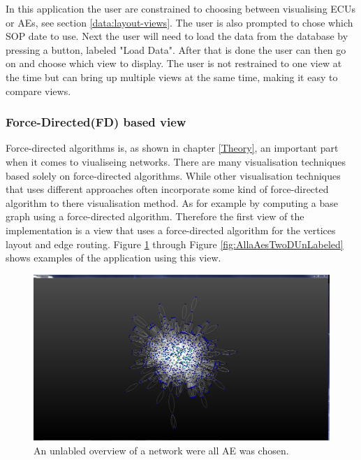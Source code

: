 \documentclass[a4paper,11pt]{kth-mag}
\begin{document}
In this application the user are constrained to choosing between visualising ECUs or AEs, see section \ref{data:layout-views}. The user is also prompted to chose which SOP date to use. Next the user 
will need to load the data from the database by pressing a button, labeled "Load Data". After that is done the user can then go on and choose which view to display. The user is not restrained to one view at the 
time but can bring up multiple views at the same time, making it easy to compare views.
\subsubsection{Force-Directed(FD) based view}
\label{FD-based-view}
Force-directed algorithms is, as shown in chapter \ref{Theory}, an important part when it comes to viualiseing networks. There are many visualisation techniques based solely on force-directed algorithms.
While other visualisation techniques that uses different approaches often incorporate some kind of force-directed algorithm to there visualisation method. As for example by computing a base graph using a
 force-directed algorithm. Therefore the first view of the implementation is a view that uses a force-directed algorithm for the vertices layout and edge routing. Figure \ref{fig:AllaAE2} through Figure \ref{fig:AllaAesTwoDUnLabeled}
 shows examples of the application using this view.

\begin{figure}[!htbp]
	\centering
	\includegraphics[scale=0.3]{SesammVisualAppPics/2D-View/Unlabled/AE/AllaAE2}
	\caption{An unlabled overview of a network were all AE was chosen.}
	\label{fig:AllaAE2}
\end{figure}
\end{document}
